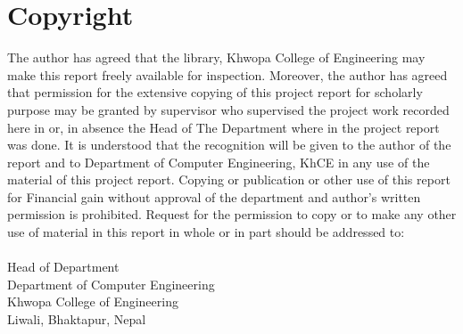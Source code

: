 \titleformat{\chapter}[display]{\normalfont\huge\bfseries}{\chaptertitlename\ \thechapter}{20pt}{\Huge}
\setcounter{page}{2}
\chapter*{Copyright}
The author has agreed that the library, Khwopa College of Engineering may make
this report freely available for inspection. Moreover, the author has agreed that
permission for the extensive copying of this project report for scholarly purpose
may be granted by supervisor who supervised the project work recorded here in
or, in absence the Head of The Department where in the project report was done.
It is understood that the recognition will be given to the author of the report and
to Department of Computer Engineering, KhCE in any use of the material of this
project report. Copying or publication or other use of this report for Financial gain
without approval of the department and author's written permission is prohibited.
Request for the permission to copy or to make any other use of material in this
report in whole or in part should be addressed to:\\ \\
Head of Department\\
Department of Computer Engineering\\
Khwopa College of Engineering\\
Liwali,
Bhaktapur, Nepal
